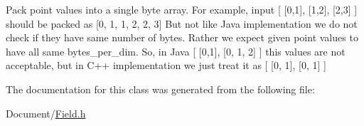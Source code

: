 Pack point values into a single byte array. For example, input \mbox{[} \mbox{[}0,1\mbox{]}, \mbox{[}1,2\mbox{]}, \mbox{[}2,3\mbox{]} \mbox{]} should be packed as \mbox{[}0, 1, 1, 2, 2, 3\mbox{]} But not like Java implementation we do not check if they have same number of bytes. Rather we expect given point values to have all same bytes\+\_\+per\+\_\+dim. So, in Java \mbox{[} \mbox{[}0,1\mbox{]}, \mbox{[}0, 1, 2\mbox{]} \mbox{]} this values are not acceptable, but in C++ implementation we just treat it as \mbox{[} \mbox{[}0, 1\mbox{]}, \mbox{[}0, 1\mbox{]} \mbox{]} 

The documentation for this class was generated from the following file\+:\begin{DoxyCompactItemize}
\item 
Document/\mbox{\hyperlink{Document_2Field_8h}{Field.\+h}}\end{DoxyCompactItemize}
